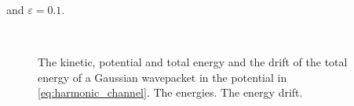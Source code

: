 and $\varepsilon = 0.1$.

\begin{figure}
  \centering
   \\
  \caption[Energies of a wavepacket in a channel like oscillator]
          {The kinetic, potential and total energy and the drift of the
           total energy of a Gaussian wavepacket in the potential in \eqref{eq:harmonic_channel}.
     The energies.
     The energy drift.
    \label{fig:hofp_energy_plots}
  }
\end{figure}

